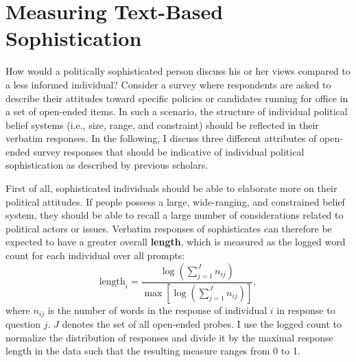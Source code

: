 \documentclass[12pt]{article}
\begin{document}
\section*{Measuring Text-Based Sophistication}



How would a politically sophisticated person discuss his or her views compared to a less informed individual? Consider a survey where respondents are asked to describe their attitudes toward specific policies or candidates running for office in a set of open-ended items. In such a scenario, the structure of individual political belief systems (i.e., size, range, and constraint) should be reflected in their verbatim responses. In the following, I discuss three different attributes of open-ended survey responses that should be indicative of individual political sophistication as described by previous scholars.

First of all, sophisticated individuals should be able to elaborate more on their political attitudes. If people possess a large, wide-ranging, and constrained belief system, they should be able to recall a large number of considerations related to political actors or issues. Verbatim responses of sophisticates can therefore be expected to have a greater overall \textbf{length}, which is measured as the logged word count for each individual over all prompts:
\begin{equation}
\text{length}_i = \dfrac{\log\left(\sum_{j=1}^J n_{ij}\right)}{\max\left[\log\left(\sum_{j=1}^J n_{ij}\right)\right]},
\end{equation}
where $n_{ij}$ is the number of words in the response of individual $i$ in response to question $j$. $J$ denotes the set of all open-ended probes. I use the logged count to normalize the distribution of responses and divide it by the maximal response length in the data such that the resulting measure ranges from 0 to 1.
\end{document}
